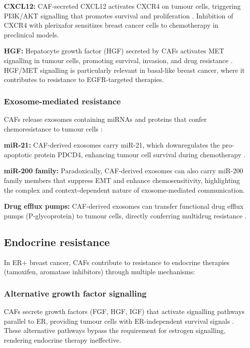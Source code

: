 \textbf{CXCL12:} CAF-secreted CXCL12 activates CXCR4 on tumour cells, triggering PI3K/AKT signalling that promotes survival and proliferation \citep{orimo2005stromal}. Inhibition of CXCR4 with plerixafor sensitizes breast cancer cells to chemotherapy in preclinical models.

\textbf{HGF:} Hepatocyte growth factor (HGF) secreted by CAFs activates MET signalling in tumour cells, promoting survival, invasion, and drug resistance \citep{wilson2014}. HGF/MET signalling is particularly relevant in basal-like breast cancer, where it contributes to resistance to EGFR-targeted therapies.

\subsubsection{Exosome-mediated resistance}

CAFs release exosomes containing miRNAs and proteins that confer chemoresistance to tumour cells \citep{zhao2023}:

\textbf{miR-21:} CAF-derived exosomes carry miR-21, which downregulates the pro-apoptotic protein PDCD4, enhancing tumour cell survival during chemotherapy \citep{zhao2023}.

\textbf{miR-200 family:} Paradoxically, CAF-derived exosomes can also carry miR-200 family members that suppress EMT and enhance chemosensitivity, highlighting the complex and context-dependent nature of exosome-mediated communication.

\textbf{Drug efflux pumps:} CAF-derived exosomes can transfer functional drug efflux pumps (P-glycoprotein) to tumour cells, directly conferring multidrug resistance \citep{zhao2023}.

\subsection{Endocrine resistance}

In ER+ breast cancer, CAFs contribute to resistance to endocrine therapies (tamoxifen, aromatase inhibitors) through multiple mechanisms:

\subsubsection{Alternative growth factor signalling}

CAFs secrete growth factors (FGF, HGF, IGF) that activate signalling pathways parallel to ER, providing tumour cells with ER-independent survival signals \citep{seth2021}. These alternative pathways bypass the requirement for estrogen signalling, rendering endocrine therapy ineffective.

